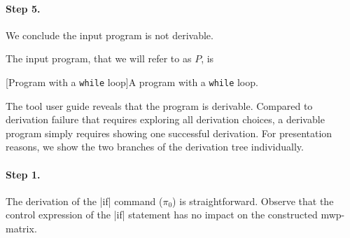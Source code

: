 \begin{example}
\paragraph*{Step 5.} We conclude the input program is not derivable.
\end{example}

\begin{example}\label{ex:while1}
The input program, that we will refer to as \(P\), is

\begin{center}
\begin{minipage}{\textwidth}
[Program with a \texttt{while} loop]{A program with a \texttt{while} loop.}
\label{lst:ex-notinfinite3}
\end{minipage}
\end{center}

The tool user guide reveals that the program is derivable.
Compared to derivation failure that requires exploring all derivation choices,
a derivable program simply requires showing one successful derivation.
For presentation reasons, we show the two branches of the derivation tree individually.

\paragraph*{Step 1.} The derivation of the \pr|if| command (\(\pi_0\)){ }is straightforward.
Observe that the control expression of the \pr|if| statement has no impact on the constructed mwp-matrix.


\end{example}
